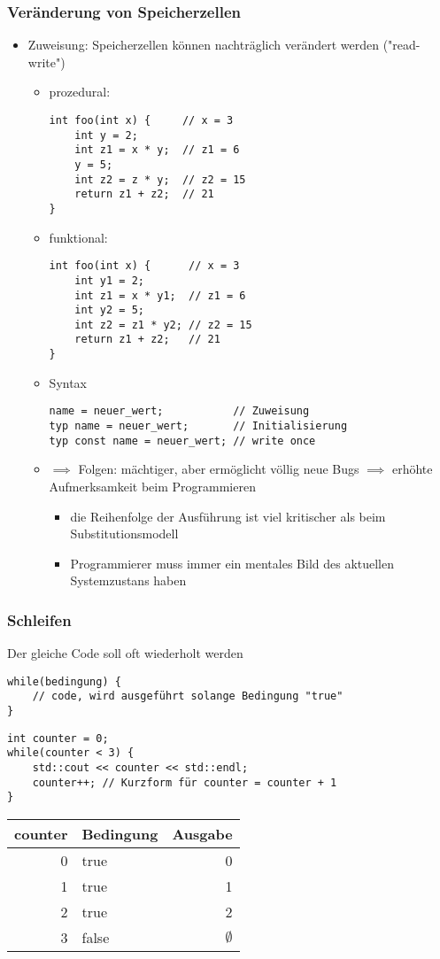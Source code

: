 \documentclass[a4paper]{scrartcl}
\theoremstyle{definition}
\theoremstyle{plain}
\theoremstyle{remark}
\theoremstyle{remark}
\begin{document}
\subsubsection{Veränderung von Speicherzellen}
\label{sec-7-2-3}
\begin{itemize}
\item Zuweisung: Speicherzellen können nachträglich verändert werden ("read-write")
\begin{itemize}
\item prozedural:
\begin{verbatim}
int foo(int x) {     // x = 3
	int y = 2;
	int z1 = x * y;  // z1 = 6
	y = 5;
	int z2 = z * y;  // z2 = 15
	return z1 + z2;  // 21
}
\end{verbatim}
\item funktional:
\begin{verbatim}
int foo(int x) {      // x = 3
	int y1 = 2;
	int z1 = x * y1;  // z1 = 6
	int y2 = 5;
	int z2 = z1 * y2; // z2 = 15
	return z1 + z2;   // 21
}
\end{verbatim}
\item Syntax
\begin{verbatim}
name = neuer_wert;           // Zuweisung
typ name = neuer_wert;       // Initialisierung
typ const name = neuer_wert; // write once
\end{verbatim}
\item $\implies$ Folgen: mächtiger, aber ermöglicht völlig neue Bugs $\implies$ erhöhte Aufmerksamkeit beim Programmieren
\begin{itemize}
\item die Reihenfolge der Ausführung ist viel kritischer als beim Substitutionsmodell
\item Programmierer muss immer ein mentales Bild des aktuellen Systemzustans haben
\end{itemize}
\end{itemize}
\end{itemize}
\subsubsection{Schleifen}
\label{sec-7-2-4}
Der gleiche Code soll oft wiederholt werden
\begin{verbatim}
while(bedingung) {
	// code, wird ausgeführt solange Bedingung "true"
}
\end{verbatim}
\begin{verbatim}
int counter = 0;
while(counter < 3) {
	std::cout << counter << std::endl;
	counter++; // Kurzform für counter = counter + 1
}
\end{verbatim}
\begin{center}
\begin{tabular}{rlr}
counter & Bedingung & Ausgabe\\
\hline
0 & true & 0\\
1 & true & 1\\
2 & true & 2\\
3 & false & $\emptyset$\\
\end{tabular}
\end{center}
\end{document}
